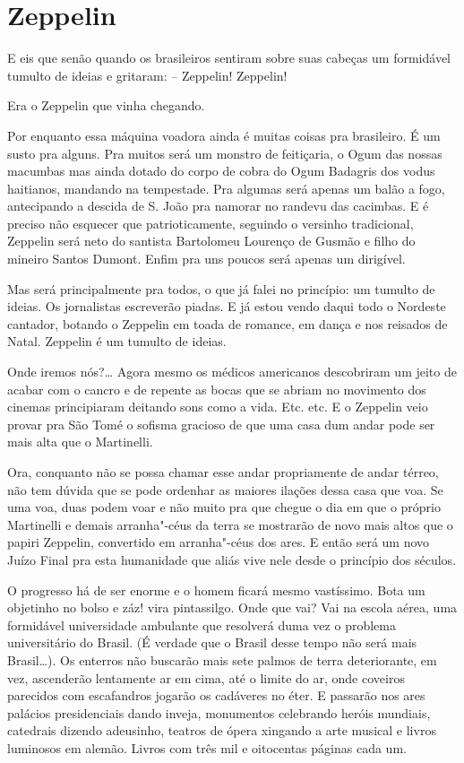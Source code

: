 \chapter{Zeppelin}

E eis que senão quando os brasileiros sentiram sobre suas cabeças um
formidável tumulto de ideias e gritaram: -- Zeppelin! Zeppelin!

Era o Zeppelin que vinha chegando.

Por enquanto essa máquina voadora ainda é muitas coisas pra brasileiro.
É um susto pra alguns. Pra muitos será um monstro de feitiçaria, o Ogum
das nossas macumbas mas ainda dotado do corpo de cobra do Ogum Badagris
dos vodus haitianos, mandando na tempestade. Pra algumas será apenas um
balão a fogo, antecipando a descida de S. João pra namorar no randevu
das cacimbas. E é preciso não esquecer que patrioticamente, seguindo o
versinho tradicional, Zeppelin será neto do santista Bartolomeu Lourenço
de Gusmão e filho do mineiro Santos Dumont. Enfim pra uns poucos será
apenas um dirigível.

Mas será principalmente pra todos, o que já falei no princípio: um
tumulto de ideias. Os jornalistas escreverão piadas. E já estou vendo
daqui todo o Nordeste cantador, botando o Zeppelin em toada de romance,
em dança e nos reisados de Natal. Zeppelin é um tumulto de ideias.

Onde iremos nós?\ldots{} Agora mesmo os médicos americanos descobriram um
jeito de acabar com o cancro e de repente as bocas que se abriam no
movimento dos cinemas principiaram deitando sons como a vida. Etc. etc.
E o Zeppelin veio provar pra São Tomé o sofisma gracioso de que uma casa
dum andar pode ser mais alta que o Martinelli.

Ora, conquanto não se possa chamar esse andar propriamente de andar
térreo, não tem dúvida que se pode ordenhar as maiores ilações dessa
casa que voa. Se uma voa, duas podem voar e não muito pra que chegue o
dia em que o próprio Martinelli e demais arranha"-céus da terra se
mostrarão de novo mais altos que o papiri Zeppelin, convertido em
arranha"-céus dos ares. E então será um novo Juízo Final pra esta
humanidade que aliás vive nele desde o princípio dos séculos.

O progresso há de ser enorme e o homem ficará mesmo vastíssimo. Bota um
objetinho no bolso e záz! vira pintassilgo. Onde que vai? Vai na escola
aérea, uma formidável universidade ambulante que resolverá duma vez o
problema universitário do Brasil. (É verdade que o Brasil desse tempo
não será mais Brasil\ldots{}). Os enterros não buscarão mais sete palmos de
terra deteriorante, em vez, ascenderão lentamente ar em cima, até o
limite do ar, onde coveiros parecidos com escafandros jogarão os
cadáveres no éter. E passarão nos ares palácios presidenciais dando
inveja, monumentos celebrando heróis mundiais, catedrais dizendo
adeusinho, teatros de ópera xingando a arte musical e livros luminosos
em alemão. Livros com três mil e oitocentas páginas cada um.

